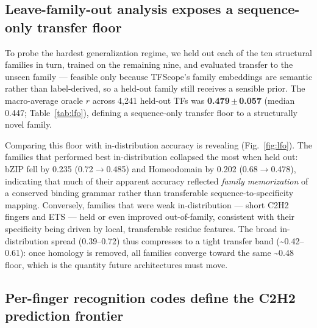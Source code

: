 \documentclass[11pt,letterpaper]{article}
\newcommand{\ts}{\textasciitilde}
\begin{document}
\subsection*{Leave-family-out analysis exposes a sequence-only transfer floor}

To probe the hardest generalization regime, we held out each of the ten structural
families in turn, trained on the remaining nine, and evaluated transfer to the
unseen family — feasible only because TFScope's family embeddings are semantic
rather than label-derived, so a held-out family still receives a sensible prior. The
macro-average oracle $r$ across 4,241 held-out TFs was \textbf{0.479\,$\pm$\,0.057}
(median 0.447; Table~\ref{tab:lfo}), defining a sequence-only transfer floor to a
structurally novel family.

Comparing this floor with in-distribution accuracy is revealing
(Fig.~\ref{fig:lfo}). The families that performed best in-distribution collapsed the
most when held out: bZIP fell by 0.235 (0.72$\to$0.485) and Homeodomain by 0.202
(0.68$\to$0.478), indicating that much of their apparent accuracy reflected
\textit{family memorization} of a conserved binding grammar rather than transferable
sequence-to-specificity mapping. Conversely, families that were weak
in-distribution — short C2H2 fingers and ETS — held or even improved out-of-family,
consistent with their specificity being driven by local, transferable residue
features. The broad in-distribution spread (0.39--0.72) thus compresses to a tight
transfer band (\ts0.42--0.61): once homology is removed, all families converge
toward the same \ts0.48 floor, which is the quantity future architectures must
move.

\subsection*{Per-finger recognition codes define the C2H2 prediction frontier}
\end{document}
